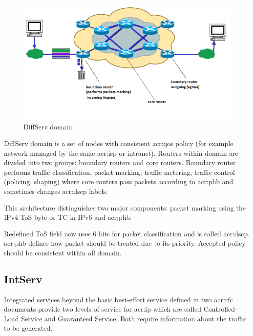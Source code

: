 \documentclass[11pt]{book}
\begin{document}
        \begin{figure}[H]
          \begin{center}
            \includegraphics[width=.7\textwidth]{img/qos/diffserv.png}
          \end{center}
          \caption{DiffServ domain}
        \end{figure} %

        DiffServ domain is a set of nodes with consistent \gls{acr:qos} policy (for example network managed by the same
        \gls{acr:isp} or intranet). Routers within domain are divided into two groups: boundary routers and core
        routers. Boundary router performs traffic classification, packet marking, traffic metering, traffic control
        (policing, shaping) where core routers pass packets according to \gls{acr:phb} and sometimes changes
        \gls{acr:dscp} labels.

        This architecture distinguishes two major components: packet marking using the IPv4 ToS byte or TC in IPv6 and
        \gls{acr:phb}.

        \medskip

        Redefined ToS field now uses 6 bits for packet classification and is called \gls{acr:dscp}. \gls{acr:phb}
        defines how packet should be treated due to its priority. Accepted policy should be consistent within all
        domain.


      \subsection{IntServ}

        Integrated services beyond the basic best-effort service defined in two \gls{acr:rfc} documents provide two levels of
        service for \gls{acr:ip} which are called Controlled-Load Service and Guaranteed Service. Both require
        information about the traffic to be generated. 
\end{document}
